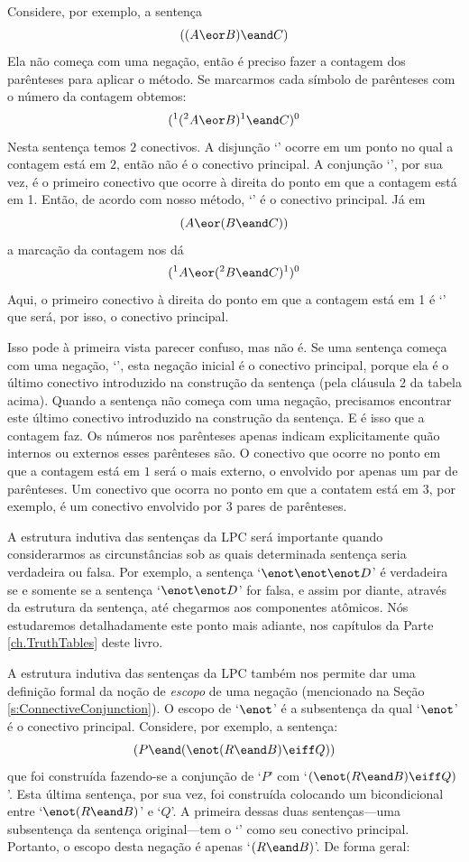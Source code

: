 Considere, por exemplo, a sentença
$$((A \eor B) \eand C)$$
Ela não começa com uma negação, então é preciso fazer a contagem dos parênteses para aplicar o método.
Se marcarmos cada símbolo de parênteses com o número da contagem obtemos:
$$(^1 (^2 A \eor B)^1 \eand C)^0$$
Nesta sentença temos $2$ conectivos.
A disjunção `\eor' ocorre em um ponto no qual a contagem está em $2$, então não é o conectivo principal.
A conjunção `\eand', por sua vez, é o primeiro conectivo que ocorre à direita do ponto em que a contagem está em 1.
Então, de acordo com nosso método, `\eand' é o conectivo principal.
Já em
$$(A \eor (B \eand C))$$
a marcação da contagem nos dá
$$(^1 A \eor (^2 B \eand C)^1 )^0$$
Aqui, o primeiro conectivo à direita do ponto em que a contagem está em 1 é `\eor' que será, por isso, o conectivo principal.

Isso pode à primeira vista parecer confuso, mas não é.
Se uma sentença começa com uma negação, `\enot', esta negação inicial é o conectivo principal, porque ela é o último conectivo introduzido na construção da sentença (pela cláusula 2 da tabela acima).
Quando a sentença não começa com uma negação, precisamos encontrar este último conectivo introduzido na construção da sentença.
E é isso que a contagem faz.
Os números nos parênteses apenas indicam explicitamente quão internos ou externos esses parênteses são.
O conectivo que ocorre no ponto em que a contagem está em $1$ será o mais externo, o envolvido por apenas um par de parênteses.
Um conectivo que ocorra no ponto em que a contatem está em $3$, por exemplo, é um conectivo envolvido por 3 pares de parênteses.
 
A estrutura indutiva das sentenças da LPC será importante quando considerarmos as circunstâncias sob as quais determinada sentença seria verdadeira ou falsa.
Por exemplo, a sentença `$\enot\enot\enot D$' é verdadeira se e somente se a sentença `$\enot\enot D$' for falsa, e assim por diante, através da estrutura da sentença, até chegarmos aos componentes atômicos.
Nós estudaremos detalhadamente este ponto mais adiante, nos capítulos da Parte \ref{ch.TruthTables} deste livro.

A estrutura indutiva das sentenças da LPC também nos permite dar uma definição formal da noção de \emph{escopo} de uma negação (mencionado na Seção  \ref{s:ConnectiveConjunction}).
O escopo de `$\enot$' é a subsentença da qual `$\enot$' é o conectivo principal.
Considere, por exemplo, a sentença:
$$(P \eand (\enot (R \eand B) \eiff Q))$$
que foi construída fazendo-se a conjunção de `$P$' com \mbox{`$(\enot(R \eand B) \eiff Q)$'}.
Esta última sentença, por sua vez, foi construída colocando um bicondicional entre `$\enot(R \eand B)$' e `$Q$'.
A primeira dessas duas sentenças---uma subsentença da sentença original---tem o `\enot' como seu conectivo principal.
Portanto, o escopo desta negação é apenas `$(R \eand B)$'.
De forma geral:

